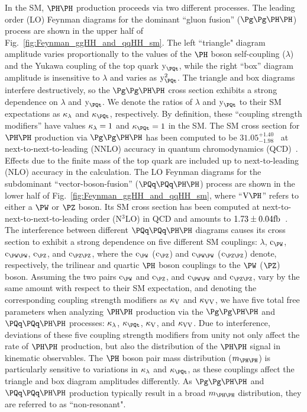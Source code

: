 In the SM, $\HH$ production proceeds via two different processes.
The leading order (LO) Feynman diagrams for the dominant ``gluon fusion'' ($\ggHH$) process are shown in the upper half of Fig.~\ref{fig:Feynman_ggHH_and_qqHH_sm}.
The left ``triangle" diagram amplitude varies proportionally to the values of the $\PHiggs$ boson self-coupling ($\lambda$)
and the Yukawa coupling of the top quark $\yt$,
while the right ``box'' diagram amplitude is insensitive to $\lambda$ and varies as $\yt^{2}$.
The triangle and box diagrams interfere destructively, 
so the $\ggHH$ cross section exhibits a strong dependence on $\lambda$ and $\yt$.
We denote the ratios of $\lambda$ and $\yt$ to their SM expectations as $\kappa_{\lambda}$ and $\kappat$, respectively.
By definition, these ``coupling strength modifiers'' have values $\kappa_{\lambda} = 1$ and $\kappat = 1$ in the SM.
The SM cross section for $\HH$ production via $\ggHH$ has been computed to be $31.05^{+1.40}_{-1.98}$~\fb
at next-to-next-to-leading (NNLO) accuracy in quantum chromodynamics (QCD)~\cite{Grazzini:2018hh}.
Effects due to the finite mass of the top quark are included up to next-to-leading (NLO) accuracy in the calculation.
The LO Feynman diagrams for the subdominant ``vector-boson-fusion'' ($\qqHH$) process are shown in the lower half of Fig.~\ref{fig:Feynman_ggHH_and_qqHH_sm},
where ``$\VH$'' refers to either a $\PW$ or $\PZ$ boson.
Its SM cross section has been computed at next-to-next-to-next-to-leading order (N$^{3}$LO) in QCD
and amounts to $1.73 \pm 0.04\text{fb}$~\cite{Dreyer:2018qbw}.
The interference between different $\qqHH$ diagrams causes its cross section to exhibit a strong dependence on five different SM couplings:
$\lambda$, $\cW$, $\cWW$, $\cZ$, and $\cZZ$,
where the $\cW$ ($\cZ$) and $\cWW$ ($\cZZ$) denote, respectively, the trilinear and quartic $\PHiggs$ boson couplings to the $\PW$ ($\PZ$) boson.
Assuming the two pairs $\cW$ and $\cZ$, and $\cWW$ and $\cZZ$, vary by the same amount with respect to their SM expectation, 
and denoting the corresponding coupling strength modifiers as $\kappa_{\textrm{V}}$ and $\kappa_{\textrm{V}\textrm{V}}$, we have five total free parameters
when analyzing $\HH$ production via the $\ggHH$ and $\qqHH$ processes: $\kappa_{\lambda}$, $\kappat$, $\kappa_{\textrm{V}}$, and $\kappa_{\textrm{V}\textrm{V}}$. %
Due to interference, deviations of these five coupling strength modifiers from unity not only affect the rate of $\HH$ production,
but also the distribution of the $\HH$ signal in kinematic observables.
The $\PHiggs$ boson pair mass distribution ($\mHH$) is particularly sensitive to variations in $\kappa_{\lambda}$ and $\kappat$,
as these couplings affect the triangle and box diagram amplitudes differently.
As $\ggHH$ and $\qqHH$ production typically result in a broad $\mHH$ distribution,
they are referred to as ``non-resonant".

